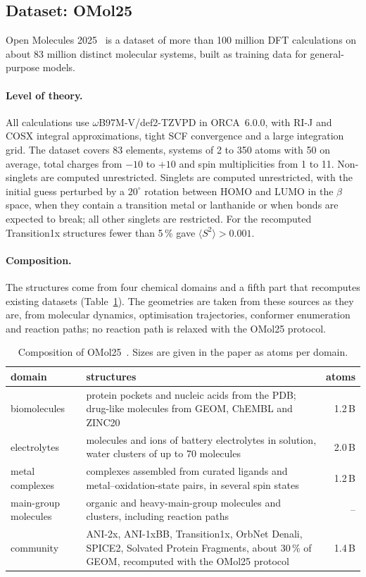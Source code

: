 \subsection{Dataset: OMol25}
\label{sec:dataset-omol}

Open Molecules 2025~\cite{omol25} is a dataset of more than 100 million
DFT calculations on about 83 million distinct molecular systems, built as
training data for general-purpose models.

\paragraph{Level of theory.} All calculations use
\mbox{$\omega$B97M-V/def2-TZVPD} in ORCA~6.0.0, with RI-J and COSX
integral approximations, tight SCF convergence and a large integration
grid. The dataset covers 83 elements, systems of 2 to 350 atoms with 50
on average, total charges from $-10$ to $+10$ and spin multiplicities
from 1 to 11. Non-singlets are computed unrestricted. Singlets are
computed unrestricted, with the initial guess perturbed by a $20^\circ$
rotation between HOMO and LUMO in the $\beta$ space, when they contain a
transition metal or lanthanide or when bonds are expected to break; all
other singlets are restricted. For the recomputed Transition1x structures
fewer than 5\,\% gave $\langle S^2 \rangle > 0.001$.

\paragraph{Composition.} The structures come from four chemical domains
and a fifth part that recomputes existing datasets
(Table~\ref{tab:omol25}). The geometries are taken from these sources as
they are, from molecular dynamics, optimisation trajectories, conformer
enumeration and reaction paths; no reaction path is relaxed with the
OMol25 protocol.

\begin{table}[h]
\centering
\small
\caption{Composition of OMol25~\cite{omol25}. Sizes are given in the
paper as atoms per domain.}
\label{tab:omol25}
\begin{tabular}{@{}l p{8.6cm} r@{}}
\toprule
domain & structures & atoms \\
\midrule
biomolecules & protein pockets and nucleic acids from the PDB; drug-like
  molecules from GEOM, ChEMBL and ZINC20 & 1.2\,B \\
electrolytes & molecules and ions of battery electrolytes in solution,
  water clusters of up to 70 molecules & 2.0\,B \\
metal complexes & complexes assembled from curated ligands and
  metal--oxidation-state pairs, in several spin states & 1.2\,B \\
main-group molecules & organic and heavy-main-group molecules and
  clusters, including reaction paths & -- \\
community & ANI-2x, ANI-1xBB, Transition1x, OrbNet Denali, SPICE2,
  Solvated Protein Fragments, about 30\,\% of GEOM, recomputed with the
  OMol25 protocol & 1.4\,B \\
\bottomrule
\end{tabular}
\end{table}

